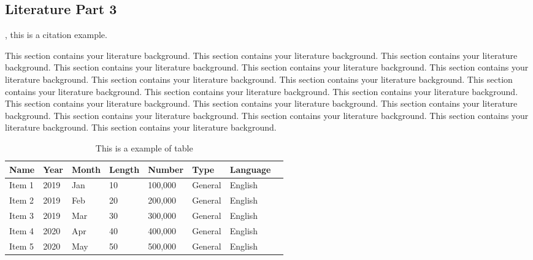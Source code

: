 {\begin{doublespacing}
\begin{flushleft}
\subsection{Literature Part 3}

\cite{ahu61}, this is a citation example.

This section contains your literature background. This section contains your literature background. This section contains your literature background. This section contains your literature background. This section contains your literature background. This section contains your literature background. This section contains your literature background. This section contains your literature background. This section contains your literature background. This section contains your literature background. This section contains your literature background. This section contains your literature background. This section contains your literature background. This section contains your literature background. This section contains your literature background. This section contains your literature background. This section contains your literature background. This section contains your literature background.

\begin{table}[!htp]
\centering
\begin{tabular}{@{}llllllll@{}}
\toprule
\textbf{Name} & \textbf{Year} & \textbf{Month} & \textbf{Length} & \textbf{Number} & \textbf{Type} & \textbf{Language} \\ \midrule
Item 1       & 2019          & Jan           & 10           & 100,000           & General       & English           \\
Item 2        & 2019          & Feb            & 20          & 200,000            & General       & English                \\
Item 3        & 2019          & Mar            & 30          & 300,000            & General         & English                  \\
Item 4    & 2020          & Apr           & 40           & 400,000            & General         & English                  \\
Item 5       & 2020          & May           & 50           & 500,000         & General       & English                  \\ \bottomrule
\end{tabular}
\caption{\label{tab: table example} This is a example of table}
\end{table}



\end{flushleft}
\end{doublespacing}
}
